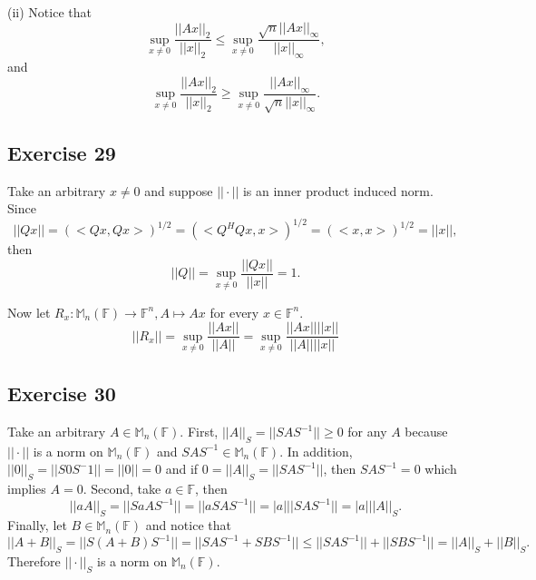 \documentclass[11.5pt, letterpaper, bibtotoc,
    tablecaptionabove, figurecaptionabove]{article}
\begin{document}
(ii)
Notice that
\begin{equation*}
    \sup_{x\neq 0}\frac{||Ax||_2}{||x||_2}\leq
    \sup_{x\neq 0}\frac{\sqrt{n}||Ax||_\infty}{||x||_\infty},
\end{equation*}
and
\begin{equation*}
    \sup_{x\neq 0}\frac{||Ax||_2}{||x||_2}\geq
    \sup_{x\neq 0}\frac{||Ax||_\infty}{\sqrt{n}||x||_\infty}.
\end{equation*}

\subsection*{Exercise 29}
Take an arbitrary $x\neq 0$ and suppose $||\cdot||$ is an inner product induced norm.
Since
\begin{equation*}
    ||Qx||=\left(<Qx,Qx>\right)^{1/2}=
    \left(<Q^HQx,x>\right)^{1/2}=
    \left(<x,x>\right)^{1/2}=
    ||x||,
\end{equation*}
then 
\begin{equation*}
    ||Q||=\sup_{x\neq 0}\frac{||Qx||}{||x||}=1.
\end{equation*}

Now let $R_x:\mathbb M_n(\mathbb F)\to\mathbb F^n, A\mapsto Ax$ for every $x\in\mathbb F^n$.
\begin{equation*}
    ||R_x||=\sup_{x\neq 0}\frac{||Ax||}{||A||}=
    \sup_{x\neq 0}\frac{||Ax||||x||}{||A||||x||}
\end{equation*}

\subsection*{Exercise 30}
Take an arbitrary $A\in\mathbb M_n(\mathbb F)$.
First, $||A||_S=||SAS^{-1}||\geq 0$ for any $A$ because 
$||\cdot||$ is a norm on $\mathbb M_n(\mathbb F)$ and 
$SAS^{-1}\in\mathbb M_n(\mathbb F)$.
In addition, $||0||_S=||S0S^-1||=||0||=0$ and if
$0=||A||_S=||SAS^{-1}||$, then $SAS^{-1}=0$ which implies $A=0$.
Second, take $a\in\mathbb F$, then 
\begin{equation*}
    ||aA||_S=||SaAS^{-1}||=
    ||aSAS^{-1}||=|a|||SAS^{-1}||=
    |a|||A||_S.
\end{equation*}
Finally, let $B\in\mathbb M_n(\mathbb F)$ and notice that
\begin{equation*}
    ||A+B||_S=||S(A+B)S^{-1}||=
    ||SAS^{-1}+SBS^{-1}||\leq||SAS^{-1}||+||SBS^{-1}||=
    ||A||_S+||B||_S.
\end{equation*}
Therefore $||\cdot||_S$ is a norm on $\mathbb M_n(\mathbb F)$.
\end{document}
